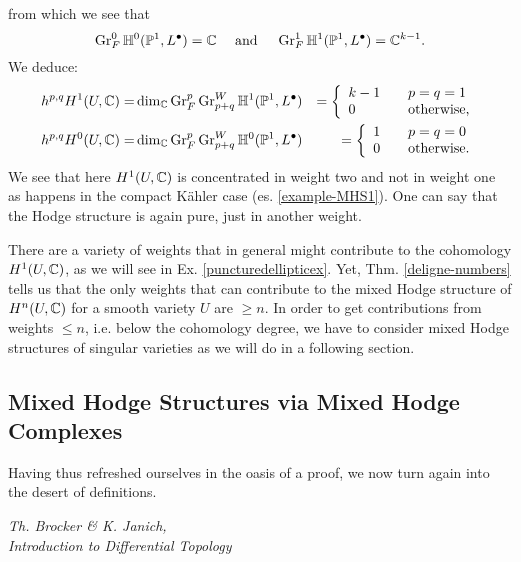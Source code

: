 \documentclass[../main.tex]{subfiles}
\begin{document}
\begin{es}
from which we see that
\[
\operatorname{Gr}^0_F \mathbb{H}^0(\mathbb{P}^1,L^\bullet) = \mathbb{C} \quad \text{ and } \quad \operatorname{Gr}^1_F \mathbb{H}^1(\mathbb{P}^1,L^\bullet) = \mathbb{C}^{k-1}.
\]
We deduce:
\begin{eqnarray*}
h^{p,q}H^1(U,\mathbb{C}) =& \dim_{\mathbb{C}} \operatorname{Gr}_F^p\operatorname{Gr}^W_{p+q}\mathbb{H}^1(\mathbb{P}^1,L^\bullet) &= \left\{\begin{array}{ll} k-1 &\quad p=q=1\\ 0&\quad\hbox{otherwise,}\end{array}\right.\\
h^{p,q}H^0(U,\mathbb{C}) =& \dim_{\mathbb{C}} \operatorname{Gr}_F^p\operatorname{Gr}^W_{p+q}\mathbb{H}^0(\mathbb{P}^1,L^\bullet) &= \left\{\begin{array}{ll} 1 &\quad p=q=0\\ 0&\quad\hbox{otherwise.}\end{array}\right.
\end{eqnarray*}
We see that here $H^1(U,\mathbb{C})$ is concentrated in weight two and not in weight one as happens in the compact K\"{a}hler case (es. \ref{example-MHS1}). One can say that the Hodge structure is again pure, just in another weight. 

There are a variety of weights that in general might contribute to the cohomology $H^1(U,\mathbb{C})$, as we will see in Ex. \ref{puncturedellipticex}. Yet, Thm. \ref{deligne-numbers}
tells us that the only weights that can contribute to the mixed Hodge structure of $H^n(U,\mathbb{C})$ for a smooth variety $U$ are $\geq n$. 
In order to get contributions from weights $\leq n$, i.e. below the cohomology degree, we have to consider mixed Hodge structures of singular varieties as we will do in a following section.
\end{es}



\subsection{Mixed Hodge Structures via Mixed Hodge Complexes} \label{sect:mhsbc}

\epigraph{Having thus refreshed ourselves in the oasis of a proof, we now turn again into the desert of definitions.}{\textit{Th. Brocker \& K. Janich, \\ Introduction to Differential Topology}}
 
\end{document}
